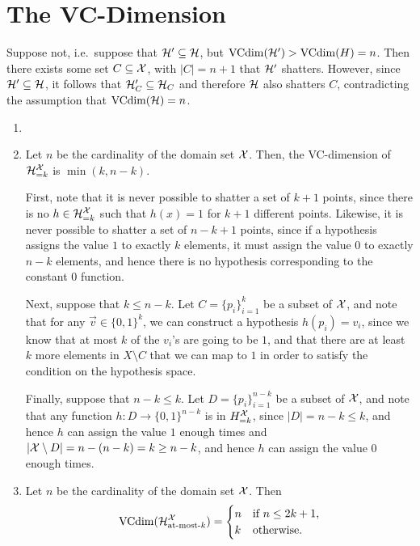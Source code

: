 \chapter{The VC-Dimension}

\begin{ex}
  Suppose not, i.e.\ suppose that $\mathcal{H}'\subseteq \mathcal{H}$, but
  $\operatorname{VCdim}(\mathcal{H}')>\operatorname{VCdim}(H)=n$. Then there exists some set $C\subseteq \mathcal{X}$, with
  $|C|=n+1$ that $\mathcal{H}'$ shatters. However, since $\mathcal{H}'\subseteq \mathcal{H}$, it follows
  that $\mathcal{H}'_C\subseteq \mathcal{H}_C$ and therefore $\mathcal{H}$ also shatters $C$,
  contradicting the assumption that $\operatorname{VCdim}(\mathcal{H})=n$.
\end{ex}

\begin{ex}
  \begin{enumerate}
    \item[]
    \item Let $n$ be the cardinality of the domain set $\mathcal{X}$. Then, the
          VC-dimension of $\mathcal{H}^{\mathcal{X}}_{=k}$ is $\min(k, n-k)$.

          First, note that it is never possible to shatter a set of $k+1$
          points, since there is no $h\in\mathcal{H}^{\mathcal{X}}_{=k}$ such that $h(x)=1$ for
          $k+1$ different points. Likewise, it is never possible to shatter a
          set of $n-k+1$ points, since if a hypothesis assigns the value $1$ to
          exactly $k$ elements, it must assign the value $0$ to exactly $n-k$
          elements, and hence there is no hypothesis corresponding to the
          constant $0$ function.

          Next, suppose that $k\leq n-k$. Let $C=\{p_i\}_{i=1}^k$ be a subset of
          $\mathcal{X}$, and note that for any $\vec{v}\in\{0,1\}^k$, we can construct a
          hypothesis $h(p_i)=v_i$, since we know that at most $k$ of the $v_i$'s
          are going to be $1$, and that there are at least $k$ more elements in
          $X\setminus C$ that we can map to $1$ in order to satisfy the
          condition on the hypothesis space.

          Finally, suppose that $n-k\leq k$. Let $D=\{p_i\}_{i=1}^{n-k}$ be a
          subset of $\mathcal{X}$, and note that any function $h:D\to \{0,1\}^{n-k}$ is
          in $H^{\mathcal{X}}_{=k}$, since $|D|=n-k\leq k$, and hence $h$ can assign the
          value $1$ enough times and $|\mathcal{X}\setminus D|=n-(n-k)=k\geq n-k$, and
          hence $h$ can assign the value $0$ enough times.
    \item Let $n$ be the cardinality of the domain set $\mathcal{X}$. Then
          \begin{align*}
            \operatorname{VCdim}(\mathcal{H}^{\mathcal{X}}_{\text{at-most-$k$}})=\begin{cases}
              n & \text{if $n\leq 2k+1$}, \\
              k & \text{otherwise}.
            \end{cases}
          \end{align*}


\end{enumerate}
\end{ex}
